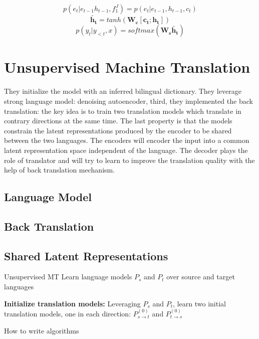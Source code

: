 \[ p(e_t|e_{t-1} h_{t-1}, f_1^J) =  p(e_t| e_{t-1}, h_{t-1}, c_t)\]
\[ \bm{\tilde{h_{t}}} = tanh(\bm{W_{c}[c_t; h_t]}) \]
\[p(y_t| y_{<t}, x) = softmax(\bm{W_s \tilde{h_t}})\]


\section{Unsupervised Machine Translation}
They initialize the model with an inferred bilingual dictionary. They leverage strong language model: denoising autoencoder,  third, they implemented the back translation: the key idea is to train two translation models which translate in contrary directions at the same time. The last property is that the models constrain the latent representations produced by the encoder to be shared between the two languages. The encoders will encoder the input into a common latent representation space independent of the language. The decoder plays the role of translator and will try to learn to improve the translation quality with the help of back translation mechanism.

\subsection{Language Model}

\subsection{Back Translation}

\subsection{Shared Latent Representations}




Unsupervised MT
Learn language models ${P_s}$ and ${P_t}$ over source and target languages

\begin{algorithm}[H]
	\SetAlgoLined
	\textbf{Initialize translation models:}  Leveraging ${P_s}$ and ${P_t}$, learn two initial translation models, one in each direction: ${P_{s\rightarrow t}^{(0)}}$ and ${P_{t\rightarrow s}^{(0)}}$ 
	\BlankLine

	

	\caption{How to write algorithms}
\end{algorithm}

